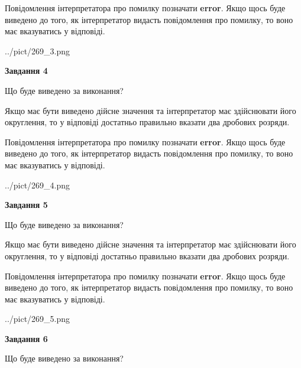 \documentclass[12pt, ukrainian]{article}
\begin{document}
{\begin {Large}
Повідомлення інтерпретатора про помилку позначати \textbf{error}.
Якщо щось буде виведено до того, як інтерпретатор видасть повідомлення про помилку, 
то воно має вказуватись у відповіді. \par

\begin{center}
	{../pict/269_3.png}
\end{center}
\newpage

{\begin {center}\textbf{Завдання 4}\end {center}}\par
Що буде виведено за виконання? \par

Якщо має бути виведено дійсне значення та інтерпретатор має здійснювати його округлення, 
то у відповіді достатньо правильно вказати два дробових розряди.

Повідомлення інтерпретатора про помилку позначати \textbf{error}.
Якщо щось буде виведено до того, як інтерпретатор видасть повідомлення про помилку, 
то воно має вказуватись у відповіді. \par

\begin{center}
	{../pict/269_4.png}
\end{center}
\newpage

{\begin {center}\textbf{Завдання 5}\end {center}}\par
Що буде виведено за виконання? \par

Якщо має бути виведено дійсне значення та інтерпретатор має здійснювати його округлення, 
то у відповіді достатньо правильно вказати два дробових розряди.

Повідомлення інтерпретатора про помилку позначати \textbf{error}.
Якщо щось буде виведено до того, як інтерпретатор видасть повідомлення про помилку, 
то воно має вказуватись у відповіді. \par

\begin{center}
	{../pict/269_5.png}
\end{center}
\newpage

{\begin {center}\textbf{Завдання 6}\end {center}}\par
Що буде виведено за виконання? \par


\end{Large}}
\end{document}
